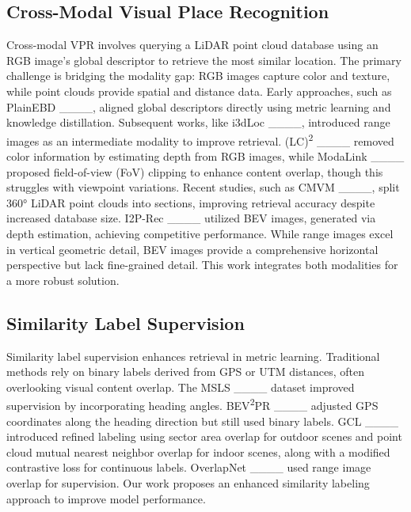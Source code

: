\subsection{Cross-Modal Visual Place Recognition}
Cross-modal VPR involves querying a LiDAR point cloud database using an RGB image's global descriptor to retrieve the most similar location. The primary challenge is bridging the modality gap: RGB images capture color and texture, while point clouds provide spatial and distance data. Early approaches, such as PlainEBD ____, aligned global descriptors directly using metric learning and knowledge distillation. Subsequent works, like i3dLoc ____, introduced range images as an intermediate modality to improve retrieval. (LC)\textsuperscript{2} ____ removed color information by estimating depth from RGB images, while ModaLink ____ proposed field-of-view (FoV) clipping to enhance content overlap, though this struggles with viewpoint variations. Recent studies, such as CMVM ____, split 360° LiDAR point clouds into sections, improving retrieval accuracy despite increased database size. I2P-Rec ____ utilized BEV images, generated via depth estimation, achieving competitive performance. While range images excel in vertical geometric detail, BEV images provide a comprehensive horizontal perspective but lack fine-grained detail. This work integrates both modalities for a more robust solution.

\subsection{Similarity Label Supervision}
Similarity label supervision enhances retrieval in metric learning. Traditional methods rely on binary labels derived from GPS or UTM distances, often overlooking visual content overlap. The MSLS ____ dataset improved supervision by incorporating heading angles. BEV\textsuperscript{2}PR ____ adjusted GPS coordinates along the heading direction but still used binary labels. GCL ____ introduced refined labeling using sector area overlap for outdoor scenes and point cloud mutual nearest neighbor overlap for indoor scenes, along with a modified contrastive loss for continuous labels. OverlapNet ____ used range image overlap for supervision. Our work proposes an enhanced similarity labeling approach to improve model performance.